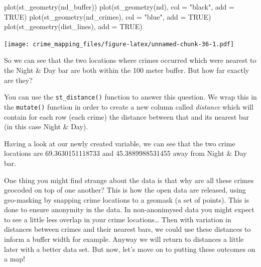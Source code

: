\documentclass[
]{book}
\newenvironment{Shaded}{\begin{snugshade}}{\end{snugshade}}
\newcommand{\AttributeTok}[1]{\textcolor[rgb]{0.77,0.63,0.00}{#1}}
\newcommand{\ConstantTok}[1]{\textcolor[rgb]{0.00,0.00,0.00}{#1}}
\newcommand{\FunctionTok}[1]{\textcolor[rgb]{0.00,0.00,0.00}{#1}}
\newcommand{\NormalTok}[1]{#1}
\newcommand{\OtherTok}[1]{\textcolor[rgb]{0.56,0.35,0.01}{#1}}
\newcommand{\SpecialCharTok}[1]{\textcolor[rgb]{0.00,0.00,0.00}{#1}}
\newcommand{\StringTok}[1]{\textcolor[rgb]{0.31,0.60,0.02}{#1}}
\begin{document}
\begin{Shaded}
\begin{Highlighting}[]
\FunctionTok{plot}\NormalTok{(}\FunctionTok{st\_geometry}\NormalTok{(nd\_buffer))}
\FunctionTok{plot}\NormalTok{(}\FunctionTok{st\_geometry}\NormalTok{(nd), }\AttributeTok{col =} \StringTok{"black"}\NormalTok{, }\AttributeTok{add =} \ConstantTok{TRUE}\NormalTok{)}
\FunctionTok{plot}\NormalTok{(}\FunctionTok{st\_geometry}\NormalTok{(nd\_crimes), }\AttributeTok{col =} \StringTok{"blue"}\NormalTok{, }\AttributeTok{add =} \ConstantTok{TRUE}\NormalTok{)}
\FunctionTok{plot}\NormalTok{(}\FunctionTok{st\_geometry}\NormalTok{(dist\_lines), }\AttributeTok{add =} \ConstantTok{TRUE}\NormalTok{)}
\end{Highlighting}
\end{Shaded}

\texttt{[image: crime\_mapping\_files/figure-latex/unnamed-chunk-36-1.pdf]}

So we can see that the two locations where crimes occurred which were nearest to the Night \& Day bar are both within the 100 meter buffer. But how far exactly are they?

You can use the \texttt{st\_distance()} function to answer this question. We wrap this in the \texttt{mutate()} function in order to create a new column called \emph{distance} which will contain for each row (each crime) the distance between that and its nearest bar (in this case Night \& Day).

\begin{Shaded}
\end{Shaded}

Having a look at our newly created variable, we can see that the two crime locations are 69.3630151118733 and 45.3889988531455 away from Night \& Day bar.

One thing you might find strange about the data is that why are all these crimes geocoded on top of one another? This is how the open data are released, using geo-masking by snapping crime locations to a geomask (a set of points). This is done to ensure anonymity in the data. In non-anonimysed data you might expect to see a little less overlap in your crime locations\ldots{} Then with variation in distances between crimes and their nearest bars, we could use these distances to inform a buffer width for example. Anyway we will return to distances a little later with a better data set. But now, let's move on to putting these outcomes on a map!
\end{document}
